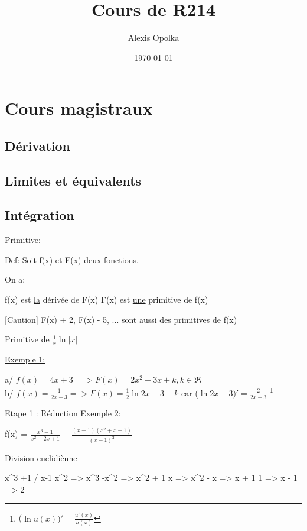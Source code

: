 \documentclass{report}
\begin{document}
  \title{Cours de R214}
  \author{Alexis Opolka}
  \date{\today}
  \maketitle

  \part{Cours magistraux}

  \chapter{Dérivation}
  \chapter{Limites et équivalents}
  \chapter{Intégration}

    Primitive:

    \underline{Def:} Soit f(x) et F(x) deux fonctions.

    On a:

    f(x) est \underline{la} dérivée de F(x)
    F(x) est \underline{une} primitive de f(x)

    [Caution] F(x) + 2, F(x) - 5, ...
    sont aussi des primitives de f(x)

    Primitive de $\frac{1}{x} \ln{|x|}$

    \underline{Exemple 1:}

    a/ $f(x) = 4x + 3 => F(x) = 2x^2 + 3x + k, k \in \Re$ \\
    b/ $f(x) = \frac{1}{2x - 3} => F(x) = \frac{1}{2} \ln{2x-3} + k$
      car ($\ln{2x-3})' =\frac{2}{2x-3}$ \footnote{($\ln{u(x)})' = \frac{u'(x)}{u(x)}$}

    \underline{Etape 1 :} Réduction
    \underline{Exemple 2:}

    f(x) = $\frac{x^3-1}{x^2-2x+1} = \frac{(x-1)(x^2 +x +1)}{(x-1)^2} = $


    Division euclidiènne

    x^3 +1 / x-1
    x^2 => x^3 -x^2 => x^2 + 1
    x => x^2 - x => x + 1
    1 => x - 1 => 2
\end{document}
